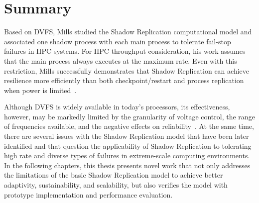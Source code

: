 \section{Summary}
Based on DVFS, Mills studied the Shadow Replication computational model and associated one shadow process with each main process to tolerate fail-stop failures in HPC systems. For HPC throughput consideration, his work assumes that the main process always executes at the maximum rate. Even with this restriction, Mills successfully demonstrates that Shadow Replication can achieve resilience more efficiently than both checkpoint/restart and process replication when power is limited~\cite{mills_2014_icnc,mills_2014_pdp,mills2014power}.

Although DVFS is widely available in today's processors, its effectiveness, however, may be markedly limited by the granularity of voltage control, the range of frequencies available, and the negative effects on reliability~\cite{Eyerman:2011:FDU:1952998.1952999,zhao2008reliability,zhao2011generalized}. At the same time, there are several issues with the Shadow Replication model that have been later identified and that question the applicability of Shadow Replication to tolerating high rate and diverse types of failures in extreme-scale computing environments. 
In the following chapters, this thesis presents novel work that not only addresses the limitations of the basic Shadow Replication model to achieve better adaptivity, sustainability, and scalability, but also verifies the model with prototype implementation and performance evaluation.
 



